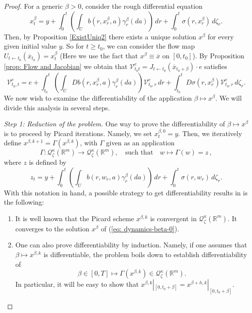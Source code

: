\documentclass[10pt,a4paper]{amsart}
\newcommand{\R}{\mathbb R}
\newcommand{\ga}{\gamma}
\newcommand{\ka}{\kappa}
\newcommand{\lp}{\left(}
\newcommand{\rp}{\right)}
\begin{document}
\begin{proof}
For a generic $\beta>0$, consider the rough differential equation
\begin{equation} \label{eq: dynamics-beta-0}
    x_{t}^{\beta}=y+\int_{0}^{t}\lp \int_{U}b(r,x_{r}^{\beta},a)\ga_{r}^{\beta}(da)\rp\,dr+\int_{0}^{t}\sigma(r,x_{r}^{\beta})\,d \zeta_{r}.
\end{equation}
Then, by Proposition \ref{ExistUniq2} there exists a unique solution $x^{\beta}$ for every given initial value $y$. So for $t\geq t_{0}$, we can consider the flow map $U_{t\leftarrow t_{0}}(\overline{x}_{t_{0}})=x_{t}^{\beta}$ (Here we use the fact that $x^{\beta}\equiv \overline{x}$ on $[0,t_{0}]$). By Proposition \ref{prop: Flow and Jacobian} we obtain that $\mathcal{V}^{e}_{t_{0}t}=J_{t\leftarrow t_{0}}(\overline{x}_{t_{0}+\beta})\cdot e$ satisfies
\[\mathcal{V}_{t_{0},t}^{e}=e+\int_{t_{0}}^{t}\lp \int_{U}Db(r,x_{r}^{\beta},a)\gamma_{r}^{\beta}(da) \rp \mathcal{V}_{t_{0},r}^{e}\,dr +\int_{t_{0}}^{t}D\sigma(r,x_{r}^{\beta})\mathcal{V}_{t_{0},r}^{e}\,d\zeta_{r}.\]
We now wish to examine the differentiability of the application $\beta\mapsto x^{\beta}$. We will divide this analysis in several steps.

\smallskip
\noindent
\textit{Step 1: Reduction of the problem.}
One way to prove the differentiability of $\beta\mapsto x^{\beta}$ is to proceed by Picard iterations. Namely, we set $x_{t}^{\beta,0}=y$. Then, we iteratively define $x^{\beta,k+1}=\Gamma(x^{\beta,k})$, with $\Gamma$ given as an application
\begin{equation*}
  \Gamma\colon \mathcal{Q}_{\zeta}^{\ka}(\R^{m})  \longrightarrow \mathcal{Q}_{\zeta}^{\ka}(\R^m) ,
\quad\text{such that}\quad
  w  \longmapsto \Gamma(w) = z \, ,
\end{equation*}
 where $z$ is defined by
 \[z_{t}=y+\int_{0}^{t}\lp \int_{U}b(r,w_{r},a)\ga_{r}^{\beta}(da)\rp\,dr+\int_{0}^{t}\sigma(r,w_{r})\,d \zeta_{r}.\]
 With this notation in hand, a possible strategy to get differentiability results in \cite[Chapter 11]{friz-victoir}  is the following:
   \begin{enumerate}[wide, labelwidth=!, labelindent=0pt, label=\textnormal{(\arabic*)}]
   \setlength\itemsep{.05in}
       \item It is well known that the Picard scheme $x^{\beta,k}$ is convergent in $\mathcal{Q}_{\zeta}^{\kappa}(\R^m)$. It converges to the solution $x^{\beta}$ of (\ref{eq: dynamics-beta-0}).
       
       \item One can also prove differentiability by induction. Namely, if one assumes that $\beta \mapsto x^{\beta,k}$ is differentiable, the problem boils down to establish differentiability of
       \begin{equation}\label{c1}
 \beta\in [0,T]  \longmapsto \Gamma(x^{\beta,k})\in\mathcal{Q}_{\zeta}^{\ka}(\R^m).
\end{equation}
In particular, it will be easy to show that $x^{\beta,k}|_{[0,t_{0}+\beta]}=x^{\beta+h,k}|_{[0,t_{0}+\beta]}$.


\end{enumerate}
\end{proof}
\end{document}
